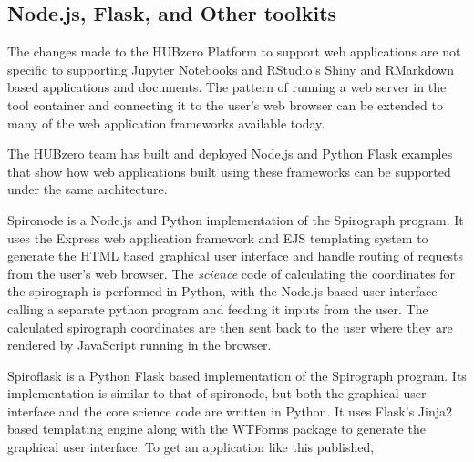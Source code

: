 \documentclass[conference]{../sty/IEEEtran}
\begin{document}


\subsection {Node.js, Flask, and Other toolkits}

The changes made to the HUBzero Platform to support web applications are not
specific to supporting Jupyter Notebooks and RStudio's Shiny and RMarkdown
based applications and documents. The pattern of running a web server in the
tool container and connecting it to the user's web browser can be extended to
many of the web application frameworks available today.

The HUBzero team has built and deployed Node.js and Python Flask examples that
show how web applications built using these frameworks can be supported under
the same architecture.

Spironode is a Node.js and Python implementation of the Spirograph program. It
uses the Express web application framework and EJS templating system to
generate the HTML based graphical user interface and handle routing of requests
from the user's web browser. The \textit{science} code of calculating the
coordinates for the spirograph is performed in Python, with the Node.js based
user interface calling a separate python program and feeding it inputs from the
user. The calculated spirograph coordinates are then sent back to the user
where they are rendered by JavaScript running in the browser.



Spiroflask is a Python Flask based implementation of the Spirograph program.
Its implementation is similar to that of spironode, but both the graphical user
interface and the core science code are written in Python. It uses Flask's
Jinja2 based templating engine along with the WTForms package to generate the
graphical user interface. To get an application like this published, 
\end{document}
